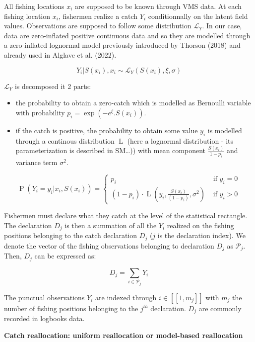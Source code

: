 \documentclass[
  english,
  man]{apa6}
\begin{document}
All fishing locations \(x_i\) are supposed to be known through VMS data. At each fishing location \(x_i\), fishermen realize a catch \(Y_i\) conditionnally on the latent field values. Observations are supposed to follow some distribution \(\mathcal{L}_Y\). In our case, data are zero-inflated positive continuous data and so they are modelled through a zero-inflated lognormal model previously introduced by Thorson (2018) and already used in Alglave et al. (2022).

\[Y_i | S(x_i), x_i \sim \mathcal{L}_Y(S(x_i),\xi,\sigma)\]

\(\mathcal{L}_Y\) is decomposed it 2 parts:

\begin{itemize}
\item
  the probability to obtain a zero-catch which is modelled as Bernoulli variable with probability \(p_{i}=\exp(-e^\xi .S(x_{i}))\).
\item
  if the catch is positive, the probability to obtain some value \(y_i\) is modelled through a continous distribution \(\operatorname{L}\) (here a lognormal distribution - its parameterization is described in SM\ldots)) with mean component \(\frac{S(x_{i})}{1-p_{i}}\) and variance term \(\sigma^2\).
\end{itemize}

\[
\operatorname{P}\left(Y_i=y_{i} | x_i, S(x_i)\right) =
\left\{
    \begin{array}{ll}
        p_i & \text { if } y_{i}=0 \\
        \left(1-p_i\right) \cdot \operatorname{L}\left(y_{i },\frac{S(x_i)}{\left(1 - p_i\right)},\sigma^{2} \right) & \text { if } y_{i} > 0
    \end{array}
\right.
\]

Fishermen must declare what they catch at the level of the statistical rectangle. The declaration \(D_j\) is then a summation of all the \(Y_i\) realized on the fishing positions belonging to the catch declaration \(D_j\) (\(j\) is the declaration index). We denote the vector of the fishing observations belonging to declaration \(D_j\) as \(\mathcal{P}_j\). Then, \(D_j\) can be expressed as:

\[D_j=\sum_{i \in \mathcal{P}_j}{Y_{i}}\]

The punctual observations \(Y_i\) are indexed through \(i \in [\![1,m_j]\!]\) with \(m_j\) the number of fishing positions belonging to the \(j^{th}\) declaration. \(D_j\) are commonly recorded in logbooks data.

\textbf{Catch reallocation: uniform reallocation or model-based reallocation}
\end{document}
